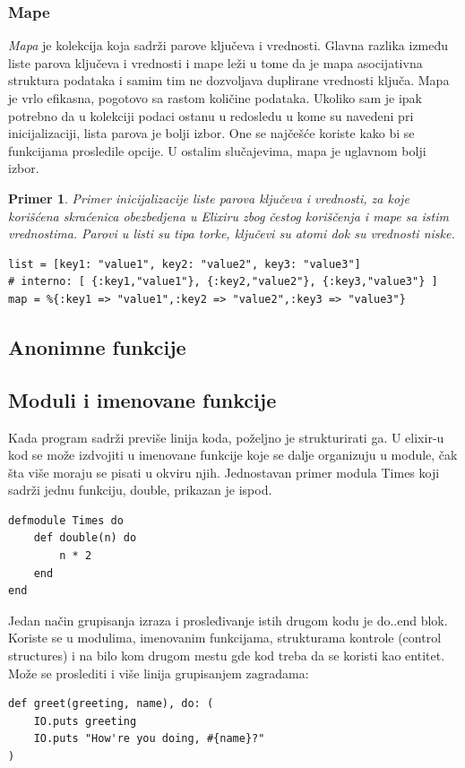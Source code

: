 \documentclass[a4paper]{article}
\newtheorem{primer}{Primer}[section]
\begin{document}
\subsubsection{Mape}
\label{sec:ime}
\textit{Mapa} je kolekcija koja sadrži parove ključeva i vrednosti. Glavna razlika između liste parova ključeva i vrednosti i mape leži u tome da je mapa asocijativna struktura podataka i samim tim ne dozvoljava duplirane vrednosti ključa. Mapa je vrlo efikasna, pogotovo sa rastom količine podataka. Ukoliko sam je ipak potrebno da u kolekciji podaci ostanu u redosledu u kome su navedeni pri inicijalizaciji, lista parova je bolji izbor. One se najčešće koriste kako bi se funkcijama prosledile opcije. U ostalim slučajevima, mapa je uglavnom bolji izbor.
\begin{primer}
Primer inicijalizacije liste parova ključeva i vrednosti, za koje korišćena skraćenica obezbedjena u Elixiru zbog čestog koriščenja i mape sa istim vrednostima. Parovi u listi su tipa torke, ključevi su atomi dok su vrednosti niske.
\end{primer}
\begin{lstlisting}[caption={Primer liste parova ključeva i vrednosti i mape},frame=single, label=simple]
list = [key1: "value1", key2: "value2", key3: "value3"]
# interno: [ {:key1,"value1"}, {:key2,"value2"}, {:key3,"value3"} ]
map = %{:key1 => "value1",:key2 => "value2",:key3 => "value3"}
\end{lstlisting}
\subsection{Anonimne funkcije}
\label{sec:ime}

\subsection{Moduli i imenovane funkcije}
\label{sec:ime}
Kada program sadrži previše linija koda, poželjno je strukturirati ga. U elixir-u kod se može izdvojiti u imenovane funkcije koje se dalje organizuju u module, čak šta više moraju se pisati u okviru njih. 
Jednostavan primer modula Times koji sadrži jednu funkciju, double, prikazan je ispod. 
\begin{verbatim}
defmodule Times do
    def double(n) do
        n * 2
    end
end   
\end{verbatim}

Jedan način grupisanja izraza i prosleđivanje istih drugom kodu je do..end blok. Koriste se u modulima, imenovanim funkcijama, strukturama kontrole (control structures) i na bilo kom drugom mestu gde kod treba da se koristi kao entitet. Može se proslediti i više linija grupisanjem zagradama:
\begin{verbatim}
def greet(greeting, name), do: (
    IO.puts greeting
    IO.puts "How're you doing, #{name}?"
)
\end{verbatim}
\end{document}
